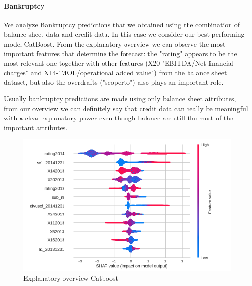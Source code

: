 \paragraph{Bankruptcy}

We analyze Bankruptcy predictions that we obtained using the combination of balance sheet data and credit data. In this case we consider our best performing model CatBoost.
From the explanatory overview we can observe the most important features that determine the forecast: the "rating" appears to be the most relevant one together with other features (X20-"EBITDA/Net financial charges" and X14-"MOL/operational added value") from the balance sheet dataset, but also the overdrafts ("scoperto") also plays an important role.

Usually bankruptcy predictions are made using only balance sheet attributes, from our overview we can definitely say that credit data can really be meaningful with a clear explanatory power even though balance are still the most of the important attributes.

\begin{figure}[H]
\includegraphics[scale = 0.7]{latex/figs/bankrupt_exp.png}
\caption{Explanatory overview Catboost}
\end{figure}

